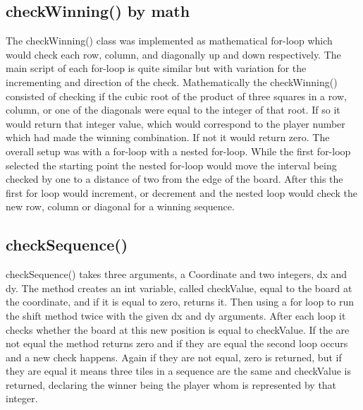 \documentclass[a4paper,10pt]{article}
\begin{document}
	\subsection{checkWinning() by math}
	The checkWinning() class was implemented as mathematical for-loop which would check each row, column, and diagonally up and down respectively. The main script of each for-loop is quite similar but with  variation for the incrementing and direction of the check. 
	Mathematically the checkWinning() consisted of checking if the cubic root of the product of three squares in a row, column, or one of the diagonals were equal to the integer of that root. If so it would return that integer value, which would correspond to the player number which had made the winning combination. If not it would return zero.  
	The overall setup was with a for-loop with a nested for-loop. While the first for-loop selected the starting point the nested for-loop would move the interval being checked by one to a distance of two from the edge of the board. After this the first for loop would increment, or decrement and the nested loop would check the new row, column or diagonal for a winning sequence.
	
	\subsection{checkSequence()}
	checkSequence() takes three arguments, a Coordinate and two integers, dx and dy. The method creates an int variable, called checkValue, equal to the board at the coordinate, and if it is equal to zero, returns it. Then using a for loop to run the shift method twice with the given dx and dy arguments. After each loop it checks whether the board at this new position is equal to checkValue. If the are not equal the method returns zero and if they are equal the second loop occurs and a new check happens. Again if they are not equal, zero is returned, but if they are equal it means three tiles in a sequence are the same and checkValue is returned, declaring the winner being the player whom is represented by that integer.
	
\end{document}
